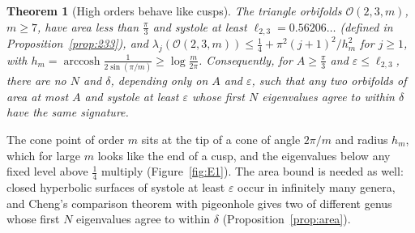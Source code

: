 \documentclass[pdflatex,sn-mathphys-num]{sn-jnl}
\theoremstyle{thmstyleone}%
\newtheorem{theorem}{Theorem}[section]%
\theoremstyle{thmstylethree}%
\newcommand{\Orb}{\mathcal{O}}
\begin{document}
\begin{theorem}[High orders behave like cusps]\label{thm:intro-cusp}
The triangle orbifolds $\Orb(2,3,m)$, $m\ge7$, have area less than $\frac\pi3$ and systole at least $\ell_{2,3}=0.56206\ldots$ (defined in Proposition~\ref{prop:233}), and $\lambda_j(\Orb(2,3,m))\le\frac14+\pi^2(j+1)^2/h_m^2$ for $j\ge1$, with $h_m=\operatorname{arccosh}\frac1{2\sin(\pi/m)}\ge\log\frac m{2\pi}$. Consequently, for $A\ge\frac\pi3$ and $\varepsilon\le\ell_{2,3}$, there are no $N$ and $\delta$, depending only on $A$ and $\varepsilon$, such that any two orbifolds of area at most $A$ and systole at least $\varepsilon$ whose first $N$ eigenvalues agree to within $\delta$ have the same signature.
\end{theorem}

The cone point of order $m$ sits at the tip of a cone of angle $2\pi/m$ and radius $h_m$, which for large $m$ looks like the end of a cusp, and the eigenvalues below any fixed level above $\frac14$ multiply (Figure~\ref{fig:E1}). The area bound is needed as well: closed hyperbolic surfaces of systole at least $\varepsilon$ occur in infinitely many genera, and Cheng's comparison theorem \cite[Thm~2.1]{cheng1975} with pigeonhole gives two of different genus whose first $N$ eigenvalues agree to within $\delta$ (Proposition~\ref{prop:area}).
\end{document}
